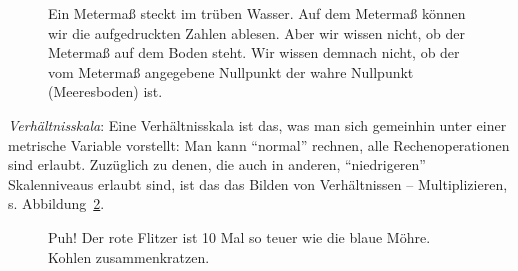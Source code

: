 \documentclass[
  letterpaper,
]{scrbook}
\theoremstyle{definition}
\theoremstyle{definition}
\theoremstyle{definition}
\theoremstyle{remark}
\begin{document}
\begin{figure}


\caption{\label{fig-intervall}Ein Metermaß steckt im trüben Wasser. Auf
dem Metermaß können wir die aufgedruckten Zahlen ablesen. Aber wir
wissen nicht, ob der Metermaß auf dem Boden steht. Wir wissen demnach
nicht, ob der vom Metermaß angegebene Nullpunkt der wahre Nullpunkt
(Meeresboden) ist.}

\end{figure}%

\emph{Verhältnisskala}: Eine Verhältnisskala ist das, was man sich
gemeinhin unter einer metrische Variable vorstellt: Man kann ``normal''
rechnen, alle Rechenoperationen sind erlaubt. Zuzüglich zu denen, die
auch in anderen, ``niedrigeren'' Skalenniveaus erlaubt sind, ist das das
Bilden von Verhältnissen -- Multiplizieren, s.
Abbildung~\ref{fig-verhaeltnis}.

\begin{figure}


\caption{\label{fig-verhaeltnis}Puh! Der rote Flitzer ist 10 Mal so
teuer wie die blaue Möhre. Kohlen zusammenkratzen.}

\end{figure}%
\end{document}
